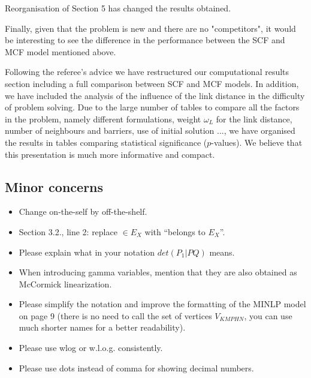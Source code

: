 \documentclass{article}
\newenvironment{reviewer}{\setcounter{pointcounter}{1}}{}
\newcommand{\point}{\text{{\selectfont \thepointcounter} \stepcounter{pointcounter}}}
\newcommand{\JP}[1]{{\color{black}#1}}
\begin{document}
\begin{reviewer}
		\begin{tcolorbox}[breakable,enhanced,coltitle=black,colback=green!5!white,colframe=green!75!black,title=\textbf{Answer R2.\point},borderline={1pt}{0pt}{black},boxrule=0pt]
            Reorganisation of Section 5 has changed the results obtained.
		\end{tcolorbox}
  
		\begin{itshape}
			Finally, given that the problem is new and there are no "competitors", it would be interesting to see the difference in the performance between the SCF and MCF model mentioned above.
		\end{itshape}
	
		\begin{tcolorbox}[breakable,enhanced,coltitle=black,colback=green!5!white,colframe=green!75!black,title=\textbf{Answer R2.\point},borderline={1pt}{0pt}{black},boxrule=0pt]
			\JP{
				Following the referee's advice we have  restructured our computational results section including a full comparison between SCF and MCF models. In addition, we have included the analysis of the influence of the link distance in the difficulty of problem solving. Due to the large number of tables to compare all the factors in the problem, namely different formulations, weight $\omega_L$ for the link distance, number of neighbours and barriers, use of initial solution ..., we have organised the results in tables comparing statistical significance ($p$-values). We believe that this presentation is much more informative and compact.}
		\end{tcolorbox}
	
		\subsection*{Minor concerns}
		
		\begin{itshape}
			\begin{itemize}
				\item Change on-the-self by off-the-shelf.
				\item Section 3.2., line 2: replace $\in E_X$ with ``belongs to $E_X$''.
				\item Please explain what in your notation $det(P_1|PQ)$ means.
				\item When introducing gamma variables, mention that they are also obtained as McCormick linearization.
				\item Please simplify the notation and improve the formatting of the MINLP model on page 9 (there is no need to call the set of vertices $V_{KMPHN}$, you can use much shorter names for a better readability).
				\item Please use wlog or w.l.o.g. consistently.
				\item Please use dots instead of comma for showing decimal numbers.
			\end{itemize}
		\end{itshape}
	

\end{reviewer}
\end{document}
